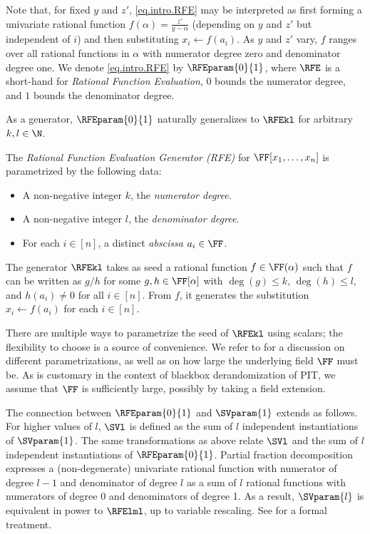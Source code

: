 Note that, for fixed \(y\) and \(z'\), \eqref{eq.intro.RFE} may be interpreted
as first forming a univariate rational function
\(f(\alpha) = \frac{z'}{y-\alpha}\)
(depending on \(y\) and \(z'\) but independent of \(i\))
and then substituting \(x_i\gets f(a_i)\).
As \(y\) and \(z'\) vary,
\(f\) ranges over all rational functions in \(\alpha\) with numerator degree zero and
denominator degree one.
We denote \eqref{eq.intro.RFE} by \(\RFEparam{0}{1}\),
where $\RFE$ is a short-hand for {\em Rational Function Evaluation},
\(0\) bounds the numerator degree, and \(1\) bounds the denominator degree.

As a generator, \(\RFEparam{0}{1}\) naturally generalizes to $\RFEkl$ for
arbitrary $k, l \in \N$.
\begin{definition}
  \label{def.rfegen}
  The \emph{Rational Function Evaluation Generator (RFE)} for
  \(\FF[x_1,\ldots,x_n]\) is
  parametrized by the following data:
  \begin{itemize}
    \item
      A non-negative integer \(k\), the \emph{numerator degree}.
    \item
      A non-negative integer \(l\), the \emph{denominator degree}.
    \item For each \(i\in [n]\), a distinct \emph{abscissa} \(a_i \in \FF\).
  \end{itemize}
  The generator \(\RFEkl\) takes as seed a rational function \(f \in \FF(\alpha)\)
  such that \(f\) can be written as \(g/h\) for some \(g,h\in\FF[\alpha]\)
  with \(\deg(g)\le k\), \(\deg(h)\le l\), and \(h(a_i)\ne0\)
  for all \(i\in[n]\).
  From \(f\),
  it generates the substitution \( x_i \gets f(a_i) \) for each \(i\in[n]\).
\end{definition}
There are multiple ways to parametrize the seed of \(\RFEkl\) using scalars; the flexibility to choose is a source of convenience. We refer to  for a discussion on different parametrizations, as well as on how large the underlying field $\FF$ must be.
As is customary in the context of blackbox derandomization of PIT, we assume that $\FF$ is sufficiently large, possibly by taking a field extension.

The connection between \(\RFEparam{0}{1}\) and $\SVparam{1}$ extends as
follows.
For higher values of $l$, $\SVl$ is defined as the sum of $l$ independent
instantiations of $\SVparam{1}$.
The same transformations as above relate $\SVl$ and the sum of $l$ independent
instantiations of $\RFEparam{0}{1}$. 
Partial fraction decomposition expresses a (non-degenerate) univariate rational function with numerator of
degree $l-1$ and denominator of degree $l$ as a sum of $l$ rational functions with numerators of degree 0 and denominators of degree 1. As a result, $\SVparam{l}$ is equivalent in power to $\RFElml$, up to variable rescaling. See  for a formal treatment. 

